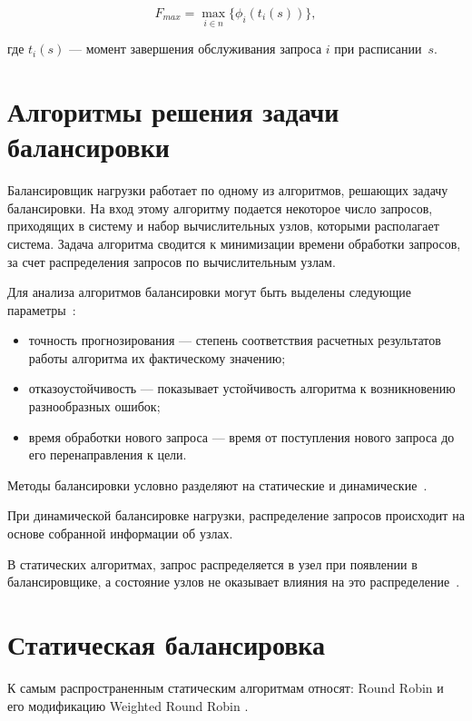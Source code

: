 \begin{equation}
	\label{eq:main_task}	
	F_{max} =   \max_{i \in n} \{\phi_i(t_i(s))\}, 
\end{equation}

где $t_i(s)$ --- момент завершения обслуживания запроса $i$ при расписании~$s$.

\section{Алгоритмы решения задачи балансировки}

Балансировщик нагрузки работает по одному из алгоритмов, решающих задачу балансировки. На вход этому алгоритму подается некоторое число запросов, приходящих в систему и набор вычислительных узлов, которыми располагает система. Задача алгоритма сводится к минимизации времени обработки запросов, за счет распределения запросов по вычислительным узлам.

Для анализа алгоритмов балансировки могут быть выделены следующие параметры~\cite{com_analysis}:
\begin{itemize}
	\item точность прогнозирования --- степень соответствия расчетных результатов работы алгоритма их фактическому значению;  
	\item отказоустойчивость --- показывает устойчивость
	алгоритма к возникновению разнообразных ошибок;
	\item время обработки нового запроса --- время от поступления нового запроса до его перенаправления к цели.
\end{itemize}

Методы балансировки условно разделяют на статические и динамические~\cite{drr, com_analysis, rate_comp}. 

При динамической балансировке нагрузки, распределение запросов происходит на основе собранной информации об узлах. 

В статических алгоритмах, запрос распределяется в узел при появлении в балансировщике, а состояние узлов не оказывает влияния на это распределение~\cite{rate_comp, com_analysis}.


\section{Статическая балансировка}

К самым распространенным статическим алгоритмам относят: Round Robin и его модификацию Weighted Round Robin \cite{drr, comp, part_algos, com_analysis}.

